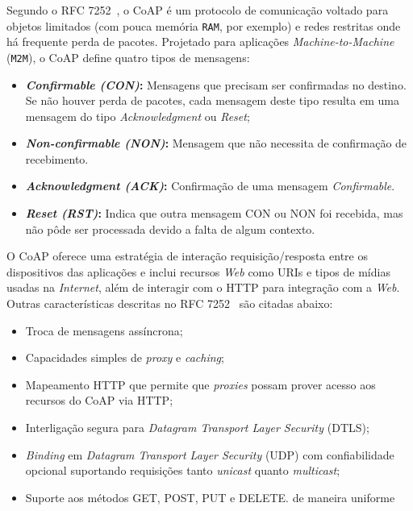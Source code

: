 Segundo o RFC 7252~\cite{shelby2014constrained}, o CoAP é um protocolo de comunicação voltado para objetos limitados (com pouca memória \texttt{RAM}, por exemplo) e redes restritas onde há frequente perda de pacotes. Projetado para aplicações \textit{Machine-to-Machine} (\texttt{M2M}), o CoAP define quatro tipos de mensagens:
\begin{itemize}
    \item \textbf{\textit{Confirmable (CON)}:} Mensagens que precisam ser confirmadas no destino. Se não houver perda de pacotes, cada mensagem deste tipo resulta em uma mensagem do tipo \textit{Acknowledgment} ou \textit{Reset};
    \item \textbf{\textit{Non-confirmable (NON)}:} Mensagem que não necessita de confirmação de recebimento.
    \item \textbf{\textit{Acknowledgment (ACK)}:} Confirmação de uma mensagem \textit{Confirmable}.
    \item \textbf{\textit{Reset (RST)}:} Indica que outra mensagem CON ou NON foi recebida, mas não pôde ser processada devido a falta de algum contexto.
\end{itemize}

O CoAP oferece uma estratégia de interação requisição/resposta entre os dispositivos das aplicações e inclui recursos \textit{Web} como URIs e tipos de mídias usadas na \textit{Internet}, além de interagir com o HTTP para integração com a \textit{Web}. Outras características descritas no RFC 7252~\cite{shelby2014constrained} são citadas abaixo:
\begin{itemize}
    \item Troca de mensagens assíncrona;
    \item Capacidades simples de \textit{proxy} e \textit{caching};
    \item Mapeamento HTTP que permite que \textit{proxies} possam prover acesso aos recursos do CoAP via HTTP;
    \item Interligação segura para \textit{Datagram Transport Layer Security} (DTLS);
    \item \textit{Binding} em \textit{Datagram Transport Layer Security} (UDP) com confiabilidade opcional suportando requisições tanto \textit{unicast} quanto \textit{multicast};
    \item Suporte aos métodos GET, POST, PUT e DELETE.
de maneira uniforme
\end{itemize}

